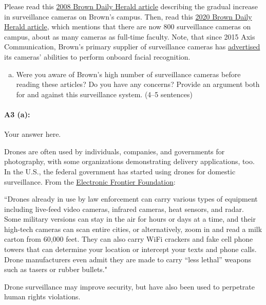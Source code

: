 Please read this \href{https://www.browndailyherald.com/2008/01/10/surveillance-cameras-on-campus-triple/}{2008 Brown Daily Herald article} describing the gradual increase in surveillance cameras on Brown’s campus. Then, read this \href{https://www.browndailyherald.com/2020/02/21/cameras-installed-hegeman-hall/}{2020 Brown Daily Herald article}, which mentions that there are now 800 surveillance cameras on campus, about as many cameras as full-time faculty. Note, that since 2015 Axis Communication, Brown’s primary supplier of surveillance cameras has \href{https://www.axis.com/customer-story/3767}{advertised} its cameras’ abilities to perform onboard facial recognition. 

\begin{enumerate}[(a)]
    \item Were you aware of Brown’s high number of surveillance cameras before reading these articles? Do you have any concerns? Provide an argument both for and against this surveillance system. (4--5 sentences)
\end{enumerate}

\paragraph{A3 (a):} Your answer here.


\newpage

Drones are often used by individuals, companies, and governments for photography, with some organizations demonstrating delivery applications, too. In the U.S., the federal government has started using drones for domestic surveillance. From the \href{https://www.eff.org/issues/surveillance-drones}{Electronic Frontier Foundation}: 
    
``Drones already in use by law enforcement can carry various types of equipment including live-feed video cameras, infrared cameras, heat sensors, and radar. Some military versions can stay in the air for hours or days at a time, and their high-tech cameras can scan entire cities, or alternatively, zoom in and read a milk carton from 60,000 feet. They can also carry WiFi crackers and fake cell phone towers that can determine your location or intercept your texts and phone calls. Drone manufacturers even admit they are made to carry “less lethal” weapons such as tasers or rubber bullets."

 Drone surveillance may improve security, but have also been used to perpetrate human rights violations.

